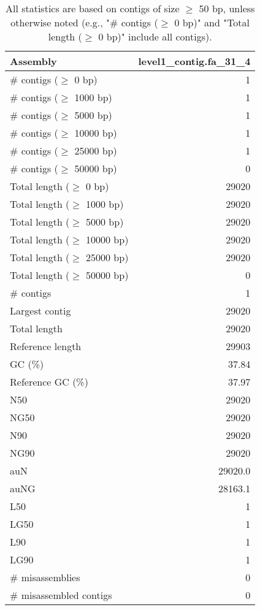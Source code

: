 \documentclass[12pt,a4paper]{article}
\begin{document}
\begin{table}[ht]
\begin{center}
\caption{All statistics are based on contigs of size $\geq$ 50 bp, unless otherwise noted (e.g., "\# contigs ($\geq$ 0 bp)" and "Total length ($\geq$ 0 bp)" include all contigs).}
\begin{tabular}{|l*{1}{|r}|}
\hline
Assembly & level1\_contig.fa\_31\_4 \\ \hline
\# contigs ($\geq$ 0 bp) & 1 \\ \hline
\# contigs ($\geq$ 1000 bp) & 1 \\ \hline
\# contigs ($\geq$ 5000 bp) & 1 \\ \hline
\# contigs ($\geq$ 10000 bp) & 1 \\ \hline
\# contigs ($\geq$ 25000 bp) & 1 \\ \hline
\# contigs ($\geq$ 50000 bp) & 0 \\ \hline
Total length ($\geq$ 0 bp) & 29020 \\ \hline
Total length ($\geq$ 1000 bp) & 29020 \\ \hline
Total length ($\geq$ 5000 bp) & 29020 \\ \hline
Total length ($\geq$ 10000 bp) & 29020 \\ \hline
Total length ($\geq$ 25000 bp) & 29020 \\ \hline
Total length ($\geq$ 50000 bp) & 0 \\ \hline
\# contigs & 1 \\ \hline
Largest contig & 29020 \\ \hline
Total length & 29020 \\ \hline
Reference length & 29903 \\ \hline
GC (\%) & 37.84 \\ \hline
Reference GC (\%) & 37.97 \\ \hline
N50 & 29020 \\ \hline
NG50 & 29020 \\ \hline
N90 & 29020 \\ \hline
NG90 & 29020 \\ \hline
auN & 29020.0 \\ \hline
auNG & 28163.1 \\ \hline
L50 & 1 \\ \hline
LG50 & 1 \\ \hline
L90 & 1 \\ \hline
LG90 & 1 \\ \hline
\# misassemblies & 0 \\ \hline
\# misassembled contigs & 0 \\ \hline

\end{tabular}
\end{center}
\end{table}
\end{document}
